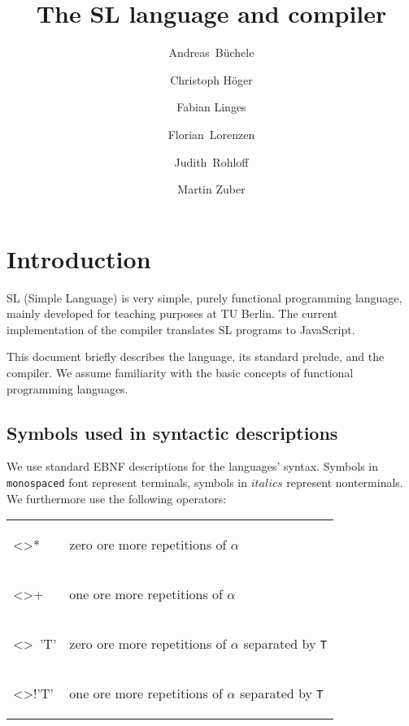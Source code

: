 \documentclass{article}
\author{Andreas~B\"uchele \and Christoph H\"oger \and Fabian Linges \and Florian~Lorenzen \and Judith~Rohloff \and Martin Zuber}
\title{The SL language and compiler}
\begin{document}
\def\open{\texttt{(}}
\def\close{\texttt{)}}
\def\bropen{\texttt{\{}}
\def\brclose{\texttt{\}}}
\def\sqopen{\texttt{[}}
\def\sqclose{\texttt{]}}
\def\squote{\texttt{'}}
\def\dquote{\texttt{"}}
\def\eq{\texttt{=}}
\def\colon{\texttt{:}}
\def\lam{\mbox{\texttt{\BackslashTT}}}
\def\bar{\texttt{|}}
\def\comma{\texttt{,}}
\def\arrow{\texttt{->}}

\def\addint{\texttt{+}}
\def\subint{\texttt{-}}
\def\mulint{\texttt{*}}
\def\divint{\texttt{/}}

\def\ltint{\texttt{<}}
\def\leint{\texttt{<=}}
\def\eqint{\texttt{==}}
\def\neint{\texttt{/=}}
\def\geint{\texttt{>=}}
\def\gtint{\texttt{>}}

\maketitle


\section{Introduction}

SL (Simple Language) is very simple, purely functional programming
language, mainly developed for teaching purposes at TU Berlin. The
current implementation of the compiler translates SL programs to
JavaScript.

This document briefly describes the language, its standard prelude,
and the compiler. We assume familiarity with the basic concepts of
functional programming languages.


\subsection{Symbols used in syntactic descriptions}

We use standard EBNF descriptions for the languages' syntax. Symbols
in \texttt{monospaced} font represent terminals, symbols in
$\mathit{italics}$ represent nonterminals. We furthermore use the
following operators:
\begin{center}
  \begin{tabular}{ll}
    \begin{grammar}<\alpha>*\end{grammar} &
    zero ore more repetitions of $\alpha$ \\
    \begin{grammar}<\alpha>+\end{grammar} &
    one ore more repetitions of $\alpha$ \\
    \begin{grammar}<\alpha>~'T'\end{grammar} &
    zero ore more repetitions of $\alpha$ separated by \texttt{T} \\
    \begin{grammar}<\alpha>!'T'\end{grammar} &
    one ore more repetitions of $\alpha$ separated by \texttt{T}
  \end{tabular}
\end{center}
\end{document}
